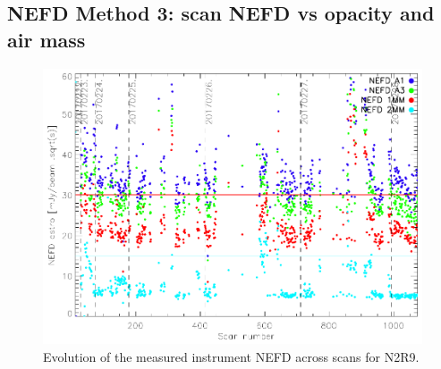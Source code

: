 \documentclass[a4paper, 11pt]{article} %
\begin{document}
\subsection{NEFD Method 3: scan NEFD vs opacity and air mass}
\begin{figure}
\begin{center}
\includegraphics[clip, angle=0, scale =0.8]{Figures/NEFDIndScans/nefd_evol_run22.pdf}
\caption{Evolution of the measured instrument NEFD across scans for N2R9.}
\label{fig:nefdvsscans}
\end{center}
\end{figure}
\end{document}
